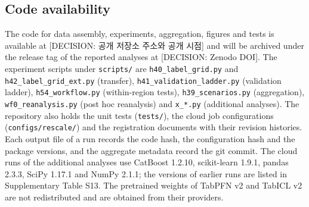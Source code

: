 \subsection*{Code availability}

The code for data assembly, experiments, aggregation, figures and tests is available at [DECISION: 공개 저장소 주소와 공개 시점] and will be archived under the release tag of the reported analyses at [DECISION: Zenodo DOI]. The experiment scripts under \texttt{scripts/} are \texttt{h40\_label\_grid.py} and \texttt{h42\_label\_grid\_ext.py} (transfer), \texttt{h41\_validation\_ladder.py} (validation ladder), \texttt{h54\_workflow.py} (within-region tests), \texttt{h39\_scenarios.py} (aggregation), \texttt{wf0\_reanalysis.py} (post hoc reanalysis) and \texttt{x\_*.py} (additional analyses). The repository also holds the unit tests (\texttt{tests/}), the cloud job configurations (\texttt{configs/rescale/}) and the registration documents with their revision histories. Each output file of a run records the code hash, the configuration hash and the package versions, and the aggregate metadata record the git commit. The cloud runs of the additional analyses use CatBoost 1.2.10, scikit-learn 1.9.1, pandas 2.3.3, SciPy 1.17.1 and NumPy 2.1.1; the versions of earlier runs are listed in Supplementary Table S13. The pretrained weights of TabPFN v2 and TabICL v2 are not redistributed and are obtained from their providers.

\fi


